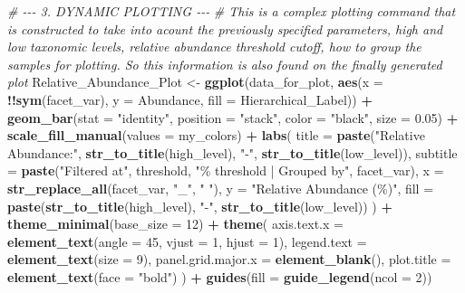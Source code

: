 \documentclass[
]{article}
\newenvironment{Shaded}{\begin{snugshade}}{\end{snugshade}}
\newcommand{\AttributeTok}[1]{\textcolor[rgb]{0.13,0.29,0.53}{#1}}
\newcommand{\CommentTok}[1]{\textcolor[rgb]{0.56,0.35,0.01}{\textit{#1}}}
\newcommand{\DecValTok}[1]{\textcolor[rgb]{0.00,0.00,0.81}{#1}}
\newcommand{\FloatTok}[1]{\textcolor[rgb]{0.00,0.00,0.81}{#1}}
\newcommand{\FunctionTok}[1]{\textcolor[rgb]{0.13,0.29,0.53}{\textbf{#1}}}
\newcommand{\NormalTok}[1]{#1}
\newcommand{\OtherTok}[1]{\textcolor[rgb]{0.56,0.35,0.01}{#1}}
\newcommand{\SpecialCharTok}[1]{\textcolor[rgb]{0.81,0.36,0.00}{\textbf{#1}}}
\newcommand{\StringTok}[1]{\textcolor[rgb]{0.31,0.60,0.02}{#1}}
\begin{document}
\begin{Shaded}
\begin{Highlighting}[]
\CommentTok{\# {-}{-}{-} 3. DYNAMIC PLOTTING {-}{-}{-}}
\CommentTok{\# This is a complex plotting command that is constructed to take into acount the previously specified parameters, high and low taxonomic levels, relative abundance threshold cutoff, how to group the samples for plotting. So this information is also found on the finally generated plot}
\NormalTok{Relative\_Abundance\_Plot }\OtherTok{\textless{}{-}} \FunctionTok{ggplot}\NormalTok{(data\_for\_plot, }\FunctionTok{aes}\NormalTok{(}\AttributeTok{x =} \SpecialCharTok{!!}\FunctionTok{sym}\NormalTok{(facet\_var), }\AttributeTok{y =}\NormalTok{ Abundance, }\AttributeTok{fill =}\NormalTok{ Hierarchical\_Label)) }\SpecialCharTok{+}
  \FunctionTok{geom\_bar}\NormalTok{(}\AttributeTok{stat =} \StringTok{"identity"}\NormalTok{, }\AttributeTok{position =} \StringTok{"stack"}\NormalTok{, }\AttributeTok{color =} \StringTok{"black"}\NormalTok{, }\AttributeTok{size =} \FloatTok{0.05}\NormalTok{) }\SpecialCharTok{+}
  \FunctionTok{scale\_fill\_manual}\NormalTok{(}\AttributeTok{values =}\NormalTok{ my\_colors) }\SpecialCharTok{+}
  \FunctionTok{labs}\NormalTok{(    }\AttributeTok{title =} \FunctionTok{paste}\NormalTok{(}\StringTok{"Relative Abundance:"}\NormalTok{, }\FunctionTok{str\_to\_title}\NormalTok{(high\_level), }\StringTok{"{-}"}\NormalTok{, }\FunctionTok{str\_to\_title}\NormalTok{(low\_level)),}
    \AttributeTok{subtitle =} \FunctionTok{paste}\NormalTok{(}\StringTok{"Filtered at"}\NormalTok{, threshold, }\StringTok{"\% threshold | Grouped by"}\NormalTok{, facet\_var),}
    \AttributeTok{x =} \FunctionTok{str\_replace\_all}\NormalTok{(facet\_var, }\StringTok{"\_"}\NormalTok{, }\StringTok{" "}\NormalTok{),}
    \AttributeTok{y =} \StringTok{"Relative Abundance (\%)"}\NormalTok{,}
    \AttributeTok{fill =} \FunctionTok{paste}\NormalTok{(}\FunctionTok{str\_to\_title}\NormalTok{(high\_level), }\StringTok{"{-}"}\NormalTok{, }\FunctionTok{str\_to\_title}\NormalTok{(low\_level))}
\NormalTok{  ) }\SpecialCharTok{+}
  \FunctionTok{theme\_minimal}\NormalTok{(}\AttributeTok{base\_size =} \DecValTok{12}\NormalTok{) }\SpecialCharTok{+}
  \FunctionTok{theme}\NormalTok{(}
    \AttributeTok{axis.text.x =} \FunctionTok{element\_text}\NormalTok{(}\AttributeTok{angle =} \DecValTok{45}\NormalTok{, }\AttributeTok{vjust =} \DecValTok{1}\NormalTok{, }\AttributeTok{hjust =} \DecValTok{1}\NormalTok{),}
    \AttributeTok{legend.text =} \FunctionTok{element\_text}\NormalTok{(}\AttributeTok{size =} \DecValTok{9}\NormalTok{),}
    \AttributeTok{panel.grid.major.x =} \FunctionTok{element\_blank}\NormalTok{(),}
    \AttributeTok{plot.title =} \FunctionTok{element\_text}\NormalTok{(}\AttributeTok{face =} \StringTok{"bold"}\NormalTok{)}
\NormalTok{  ) }\SpecialCharTok{+}
  \FunctionTok{guides}\NormalTok{(}\AttributeTok{fill =} \FunctionTok{guide\_legend}\NormalTok{(}\AttributeTok{ncol =} \DecValTok{2}\NormalTok{))}
\end{Highlighting}
\end{Shaded}
\end{document}
